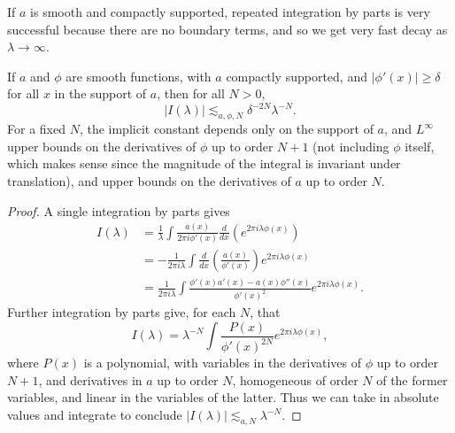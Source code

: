 If $a$ is smooth and compactly supported, repeated integration by parts is very successful because there are no boundary terms, and so we get very fast decay as $\lambda \to \infty$.

\begin{theorem}
    If $a$ and $\phi$ are smooth functions, with $a$ compactly supported, and $|\phi'(x)| \geq \delta$ for all $x$ in the support of $a$, then for all $N > 0$,
    \[ |I(\lambda)| \lesssim_{a,\phi,N} \delta^{-2N} \lambda^{-N}. \]
    For a fixed $N$, the implicit constant depends only on the support of $a$, and $L^\infty$ upper bounds on the derivatives of $\phi$ up to order $N+1$ (not including $\phi$ itself, which makes sense since the magnitude of the integral is invariant under translation), and upper bounds on the derivatives of $a$ up to order $N$.
\end{theorem}
\begin{proof}
  A single integration by parts gives
  \begin{align*} I(\lambda) &= \frac{1}{\lambda} \int \frac{a(x)}{2 \pi i \phi'(x)} \frac{d}{dx} \left( e^{2 \pi i \lambda \phi(x)} \right)\\
  &= - \frac{1}{2 \pi i \lambda} \int \frac{d}{dx} \left( \frac{a(x)}{\phi'(x)} \right) e^{2 \pi i \lambda \phi(x)}\\
  &= \frac{1}{2 \pi i \lambda} \int \frac{\phi'(x) a'(x) - a(x) \phi''(x)}{\phi'(x)^2} e^{2 \pi i \lambda \phi(x)}.
  \end{align*}
  Further integration by parts give, for each $N$, that
  \[ I(\lambda) = \lambda^{-N} \int \frac{P(x)}{\phi'(x)^{2N}} e^{2 \pi i \lambda \phi(x)}, \]
  where $P(x)$ is a polynomial, with variables in the derivatives of $\phi$ up to order $N+1$, and derivatives in $a$ up to order $N$, homogeneous of order $N$ of the former variables, and linear in the variables of the latter. Thus we can take in absolute values and integrate to conclude $|I(\lambda)| \lesssim_{a,N} \lambda^{-N}$.
\end{proof}

